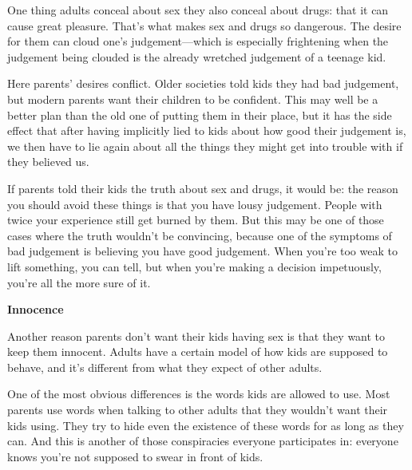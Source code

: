 One thing adults conceal about
                  sex they also conceal about drugs: that it can cause great
                  pleasure. That's what makes sex and drugs so dangerous. The
                  desire for them can cloud one's judgement---which is
                  especially frightening when the judgement being clouded is the
                  already wretched judgement of a teenage kid.

Here
                  parents' desires conflict. Older societies told kids they had
                  bad judgement, but modern parents want their children to be
                  confident. This may well be a better plan than the old one of
                  putting them in their place, but it has the side effect that
                  after having implicitly lied to kids about how good their
                  judgement is, we then have to lie again about all the things
                  they might get into trouble with if they believed us.

If
                  parents told their kids the truth about sex and drugs, it
                  would be: the reason you should avoid these things is that you
                  have lousy judgement. People with twice your experience still
                  get burned by them. But this may be one of those cases where
                  the truth wouldn't be convincing, because one of the symptoms
                  of bad judgement is believing you have good judgement. When
                  you're too weak to lift something, you can tell, but when
                  you're making a decision impetuously, you're all the more sure
                  of it.


                  \textbf{Innocence}

Another reason parents don't want
                  their kids having sex is that they want to keep them innocent.
                  Adults have a certain model of how kids are supposed to
                  behave, and it's different from what they expect of other
                  adults.

One of the most obvious differences is the
                  words kids are allowed to use. Most parents use words when
                  talking to other adults that they wouldn't want their kids
                  using. They try to hide even the existence of these words for
                  as long as they can. And this is another of those conspiracies
                  everyone participates in: everyone knows you're not supposed
                  to swear in front of kids.

